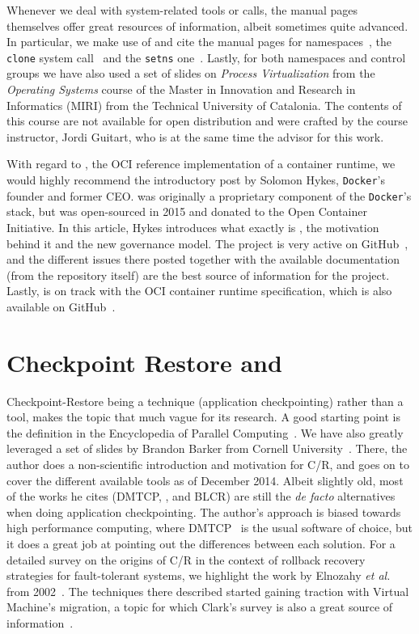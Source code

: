Whenever we deal with system-related tools or calls, the manual pages themselves offer great resources of information, albeit sometimes quite advanced.
In particular, we make use of and cite the manual pages for namespaces~\cite{namespaces-manual}, the \texttt{clone} system call~\cite{clone-manual} and the \texttt{setns} one~\cite{setns-manual}.
Lastly, for both namespaces and control groups we have also used a set of slides on \textit{Process Virtualization} from the \textit{Operating Systems} course of the Master in Innovation and Research in Informatics (MIRI) from the Technical University of Catalonia.
The contents of this course are not available for open distribution and were crafted by the course instructor, Jordi Guitart, who is at the same time the advisor for this work.

With regard to \runc, the OCI reference implementation of a container runtime, we would highly recommend the introductory post by Solomon Hykes, \texttt{Docker}'s founder and former CEO.
\runc was originally a proprietary component of the \texttt{Docker}'s stack, but was open-sourced in 2015 and donated to the Open Container Initiative.
In this article, Hykes introduces what exactly is \runc, the motivation behind it and the new governance model.
The project is very active on GitHub~\cite{runc-memtrack}, and the different issues there posted together with the available documentation (from the repository itself) are the best source of information for the project.
Lastly, \runc is on track  with the OCI container runtime specification, which is also available on GitHub~\cite{runc-spec}.

\section{Checkpoint Restore and \criu} \label{sec:rw-criu}

Checkpoint-Restore being a technique (application checkpointing) rather than a tool, makes the topic that much vague for its research.
A good starting point is the definition in the Encyclopedia of Parallel Computing~\cite{Schulz2011}.
We have also greatly leveraged a set of slides by Brandon Barker from Cornell University~\cite{Barker2014}.
There, the author does a non-scientific introduction and motivation for C/R, and goes on to cover the different available tools as of December 2014.
Albeit slightly old, most of the works he cites (DMTCP, \criu, and BLCR) are still the \textit{de facto} alternatives when doing application checkpointing.
The author's approach is biased towards high performance computing, where DMTCP~\cite{dmtcp} is the usual software of choice, but it does a great job at pointing out the differences between each solution.
For a detailed survey on the origins of C/R in the context of rollback recovery strategies for fault-tolerant systems, we highlight the work by Elnozahy \textit{et al.} from 2002~\cite{Elnozahy2002}.
The techniques there described started gaining traction with Virtual Machine's migration, a topic for which Clark's survey is also a great source of information~\cite{Clark2005}.

